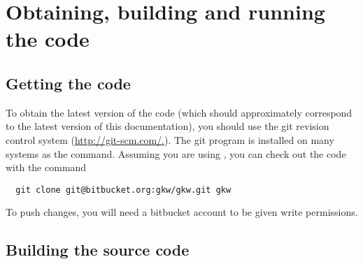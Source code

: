 \chapter{Obtaining, building and running the code} \label{usage}

\section{Getting the code}

To obtain the latest version of the code (which should approximately
correspond to the latest version of this documentation), you should use the
git revision control system (\href{http://git-scm.com/.}
{http://git-scm.com/.}). The git program is installed on many
systems as the  command. Assuming you are using , you can
check out the code with the command
\begin{verbatim}
  git clone git@bitbucket.org:gkw/gkw.git gkw
\end{verbatim}
To push changes, you will need a bitbucket account to be given write permissions.




\section{Building the source code}


